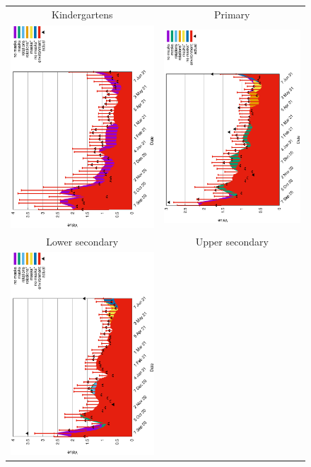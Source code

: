 \documentclass[fleqn,10pt]{wlscirep}
\begin{document}
\begin{figure}
\begin{center}
\begin{tabular}{cc}
Kindergartens & Primary  \\
\includegraphics[angle=270,width=7cm]{rho1.eps} &\includegraphics[angle=270,width=7cm]{rho2.eps}\\ 
 Lower secondary & Upper secondary \\
\includegraphics[angle=270,width=7cm]{rho3.eps} & 

\end{tabular}
\end{center}
\end{figure}
\end{document}
